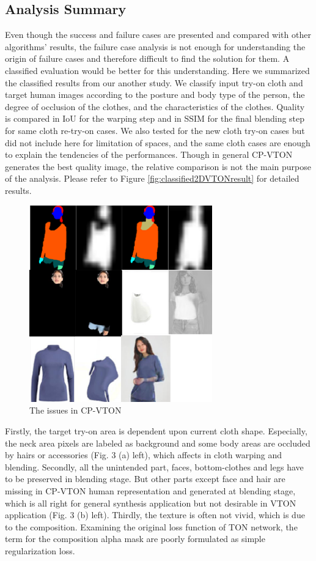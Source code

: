  
\subsection{Analysis Summary}


Even though the success and failure cases are presented and compared with other algorithms' results, the failure case analysis is not enough for understanding the origin of failure cases and therefore difficult to find the solution for them. A classified evaluation would be better for this understanding. Here we summarized the classified results from our another study. We classify input try-on cloth and target human images according to the posture and body type of the person, the degree of occlusion of the clothes, and the characteristics of the clothes. Quality is compared in IoU for the warping step and in SSIM for the final blending step for same cloth re-try-on cases. We also tested for the new cloth try-on cases but did not include here for limitation of spaces, and the same cloth cases are enough to explain the tendencies of the performances. Though in general CP-VTON generates the best quality image, the relative comparison is not the main purpose of the analysis. Please refer to Figure \ref{fig:classified2DVTONresult} for detailed results.


\begin{figure}
\centering
\includegraphics[height=8.5cm, scale=1]{figures/cpvtonissues.png}   %
\caption{The issues in CP-VTON}
\label{fig:cpvtonissues}
\end{figure}


Firstly, the target try-on area is dependent upon current cloth shape. Especially, the neck area pixels are labeled as background and some body areas are occluded by hairs or accessories (Fig. 3 (a) left), which affects in cloth warping and blending. Secondly, all the unintended part, faces, bottom-clothes and legs have to be preserved in blending stage. But other parts except face and hair are missing in CP-VTON\cite{Wang2018TowardCI} human representation and generated at blending stage, which is all right for general synthesis application but not desirable in VTON application (Fig. 3 (b) left). Thirdly, the texture is often not vivid, which is due to the composition. Examining the original loss function of TON network, the term for the composition alpha mask are poorly formulated as simple regularization loss.   

